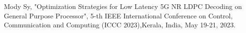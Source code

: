 
Mody Sy, "Optimization Strategies for Low Latency 5G NR LDPC Decoding on General Purpose Processor", 5-th IEEE International Conference on Control, Communication and Computing (ICCC 2023),Kerala, India, May 19-21, 2023.

